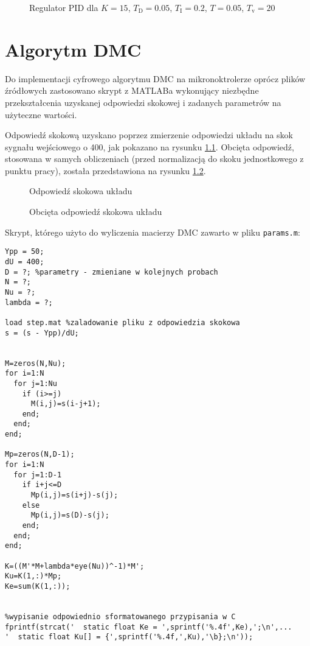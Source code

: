 \begin{figure}[H]
\centering

\label{R12}
\caption{Regulator PID dla $K = 15$, $T_\mathrm{D} = 0.05$, $T_\mathrm{I} = 0.2$, $T = 0.05$, $T_\mathrm{v} = 20$}
\end{figure}


\chapter{Algorytm DMC}

Do implementacji cyfrowego algorytmu DMC na mikronoktrolerze oprócz plików źródłowych zastosowano skrypt z MATLABa wykonujący niezbędne przekształcenia uzyskanej odpowiedzi skokowej i zadanych parametrów na użyteczne wartości.

Odpowiedź skokową uzyskano poprzez zmierzenie odpowiedzi układu na skok sygnału wejściowego o 400, jak pokazano na rysunku \ref{DMC1}. Obcięta odpowiedź, stosowana w samych obliczeniach (przed normalizacją do skoku jednostkowego z punktu pracy), została przedstawiona na rysunku \ref{DMC2}.


\begin{figure}[H]
\centering

\caption{Odpowiedź skokowa układu}
\label{DMC1}
\end{figure}

\begin{figure}[H]
\centering

\caption{Obcięta odpowiedź skokowa układu}
\label{DMC2}
\end{figure}

Skrypt, którego użyto do wyliczenia macierzy DMC zawarto w pliku \verb|params.m|:

\begin{lstlisting}[style=Matlab-editor]
Ypp = 50;
dU = 400;
D = ?; %parametry - zmieniane w kolejnych probach
N = ?;
Nu = ?;
lambda = ?;

load step.mat %zaladowanie pliku z odpowiedzia skokowa
s = (s - Ypp)/dU;


M=zeros(N,Nu);
for i=1:N
  for j=1:Nu
    if (i>=j)
      M(i,j)=s(i-j+1);
    end;
  end;
end;

Mp=zeros(N,D-1);
for i=1:N
  for j=1:D-1
    if i+j<=D
      Mp(i,j)=s(i+j)-s(j);
    else
      Mp(i,j)=s(D)-s(j);
    end;
  end;
end;

K=((M'*M+lambda*eye(Nu))^-1)*M';
Ku=K(1,:)*Mp;
Ke=sum(K(1,:));


%wypisanie odpowiednio sformatowanego przypisania w C
fprintf(strcat('  static float Ke = ',sprintf('%.4f',Ke),';\n',...
'  static float Ku[] = {',sprintf('%.4f,',Ku),'\b};\n'));

\end{lstlisting}

